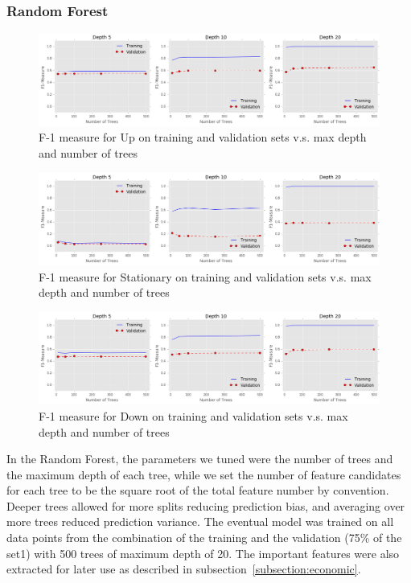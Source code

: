 \documentclass[11pt]{article}
\begin{document}
\subsubsection{Random Forest}
\begin{figure}[H]
\centering
\includegraphics [width=0.9\linewidth,height=0.22\linewidth]{./figures/tree_mid_up_f1.png}
\caption{F-1 measure for Up on training and validation sets v.s. max depth and number of trees}
\label{fig:mid_f1_1}
\end{figure}
\begin{figure}[H]
\centering
\includegraphics [width=0.9\linewidth,height=0.22\linewidth]{./figures/tree_mid_stat_f1.png}
\caption{F-1 measure for Stationary on training and validation sets v.s. max depth and number of trees}
\label{fig:mid_f1_2}
\end{figure}
\begin{figure}[H]
\centering
\includegraphics [width=0.9\linewidth,height=0.22\linewidth]{./figures/tree_mid_down_f1.png}
\caption{F-1 measure for Down on training and validation sets v.s. max depth and number of trees}
\label{fig:mid_f1_3}
\end{figure}
In the Random Forest, the parameters we tuned were the number of trees and the maximum depth of each tree, while we set the number of feature candidates for each tree to be the square root of the total feature number by convention. Deeper trees allowed for more splits reducing prediction bias, and averaging over more trees reduced prediction variance. The eventual model was trained on all data points from the combination of the training and the validation (75\% of the set1) with 500 trees of maximum depth of 20. The important features were also extracted for later use as described in subsection~\ref{subsection:economic}.
\end{document}
